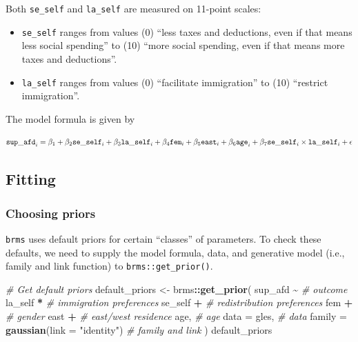 \documentclass[
  11pt,
]{article}
\newenvironment{Shaded}{\begin{snugshade}}{\end{snugshade}}
\newcommand{\AttributeTok}[1]{\textcolor[rgb]{0.13,0.29,0.53}{#1}}
\newcommand{\CommentTok}[1]{\textcolor[rgb]{0.56,0.35,0.01}{\textit{#1}}}
\newcommand{\FunctionTok}[1]{\textcolor[rgb]{0.13,0.29,0.53}{\textbf{#1}}}
\newcommand{\NormalTok}[1]{#1}
\newcommand{\OtherTok}[1]{\textcolor[rgb]{0.56,0.35,0.01}{#1}}
\newcommand{\SpecialCharTok}[1]{\textcolor[rgb]{0.81,0.36,0.00}{\textbf{#1}}}
\newcommand{\StringTok}[1]{\textcolor[rgb]{0.31,0.60,0.02}{#1}}
\providecommand{\tightlist}{%
  \setlength{\itemsep}{0pt}\setlength{\parskip}{0pt}}
\begin{document}
Both \texttt{se\_self} and \texttt{la\_self} are measured on 11-point scales:

\begin{itemize}
\tightlist
\item
  \texttt{se\_self} ranges from values (0) ``less taxes and deductions, even if that means less social spending'' to (10) ``more social spending, even if that means more taxes and deductions''.
\item
  \texttt{la\_self} ranges from values (0) ``facilitate immigration'' to (10) ``restrict immigration''.
\end{itemize}

The model formula is given by

\[
\mathtt{sup\_afd}_i = \\\beta_1 + \beta_2 \mathtt{se\_self}_i + \beta_3 \mathtt{la\_self}_i + \\ \beta_4 \mathtt{fem}_i + \beta_5 \mathtt{east}_i + \beta_6 \mathtt{age}_i + \\ \beta_7 \mathtt{se\_self}_i \times \mathtt{la\_self}_i + \epsilon
\]

\hypertarget{fitting}{%
\subsection{Fitting}\label{fitting}}

\hypertarget{choosing-priors}{%
\subsubsection{Choosing priors}\label{choosing-priors}}

\texttt{brms} uses default priors for certain ``classes'' of parameters. To check these defaults,
we need to supply the model formula, data, and generative model (i.e., family and link function) to
\texttt{brms::get\_prior()}.

\begin{Shaded}
\begin{Highlighting}[]
\CommentTok{\# Get default priors}
\NormalTok{default\_priors }\OtherTok{\textless{}{-}}\NormalTok{ brms}\SpecialCharTok{::}\FunctionTok{get\_prior}\NormalTok{(}
\NormalTok{  sup\_afd }\SpecialCharTok{\textasciitilde{}}                              \CommentTok{\# outcome}
\NormalTok{    la\_self }\SpecialCharTok{*}                            \CommentTok{\# immigration preferences}
\NormalTok{    se\_self }\SpecialCharTok{+}                            \CommentTok{\# redistribution preferences}
\NormalTok{    fem }\SpecialCharTok{+}                                \CommentTok{\# gender}
\NormalTok{    east }\SpecialCharTok{+}                               \CommentTok{\# east/west residence}
\NormalTok{    age,                                 }\CommentTok{\# age}
  \AttributeTok{data =}\NormalTok{ gles,                           }\CommentTok{\# data}
  \AttributeTok{family =} \FunctionTok{gaussian}\NormalTok{(}\AttributeTok{link =} \StringTok{"identity"}\NormalTok{)   }\CommentTok{\# family and link}
\NormalTok{)}
\NormalTok{default\_priors}
\end{Highlighting}
\end{Shaded}
\end{document}
